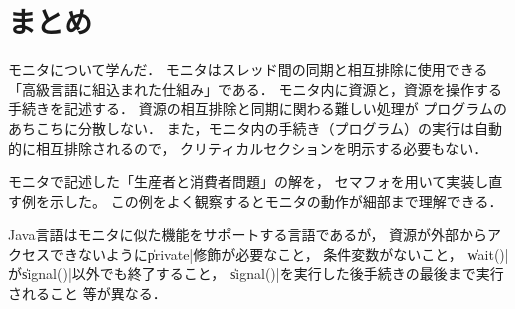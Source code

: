\section{まとめ}
モニタについて学んだ．
モニタはスレッド間の同期と相互排除に使用できる
「高級言語に組込まれた仕組み」である．
モニタ内に資源と，資源を操作する手続きを記述する．
資源の相互排除と同期に関わる難しい処理が
プログラムのあちこちに分散しない．
また，モニタ内の手続き（プログラム）の実行は自動的に相互排除されるので，
クリティカルセクションを明示する必要もない．

モニタで記述した「生産者と消費者問題」の解を，
セマフォを用いて実装し直す例を示した。
この例をよく観察するとモニタの動作が細部まで理解できる．

Java言語はモニタに似た機能をサポートする言語であるが，
資源が外部からアクセスできないように\|private|修飾が必要なこと，
条件変数がないこと，
\|wait()|が\|signal()|以外でも終了すること，
\|signal()|を実行した後手続きの最後まで実行されること
等が異なる．

